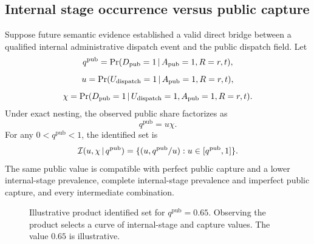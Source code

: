 \documentclass[11pt]{article}
\begin{document}
\subsection{Internal stage occurrence versus public capture}

Suppose future semantic evidence established a valid direct bridge between a qualified internal administrative dispatch event and the public dispatch field. Let
\begin{equation}
q^{\mathrm{pub}}=\Pr(D_{\mathrm{pub}}=1\,|\, A_{\mathrm{pub}}=1,R=r,t),
\end{equation}
\begin{equation}
u=\Pr(U_{\mathrm{dispatch}}=1\,|\, A_{\mathrm{pub}}=1,R=r,t),
\end{equation}
\begin{equation}
\chi=\Pr(D_{\mathrm{pub}}=1\,|\, U_{\mathrm{dispatch}}=1,A_{\mathrm{pub}}=1,R=r,t).
\end{equation}
Under exact nesting, the observed public share factorizes as
\begin{equation}
q^{\mathrm{pub}}=u\chi.
\label{eq:product}
\end{equation}
For any $0<q^{\mathrm{pub}}<1$, the identified set is
\begin{equation}
\mathcal{I}(u,\chi\,|\, q^{\mathrm{pub}})
=\{(u,q^{\mathrm{pub}}/u):u\in[q^{\mathrm{pub}},1]\}.
\label{eq:hyperbola}
\end{equation}
The same public value is compatible with perfect public capture and a lower internal-stage prevalence, complete internal-stage prevalence and imperfect public capture, and every intermediate combination.

\begin{figure}[t]
\centering
{}
\caption{Illustrative product identified set for $q^{\mathrm{pub}}=0.65$. Observing the product selects a curve of internal-stage and capture values. The value $0.65$ is illustrative.}
\label{fig:hyperbola}
\end{figure}
\end{document}
